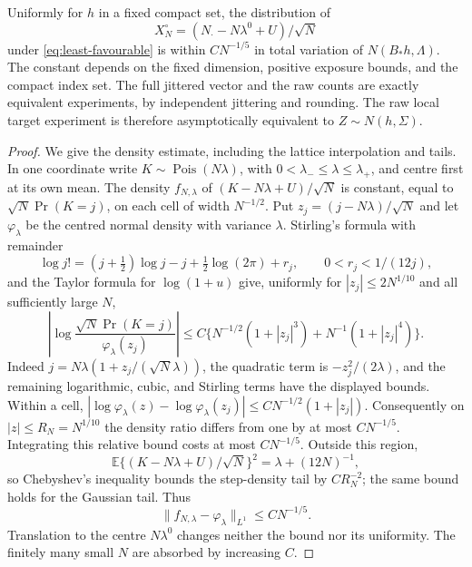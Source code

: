 \begin{lemma}\label{lem:poisson-TV}
Uniformly for $h$ in a fixed compact set, the distribution of
\[
 X_N^\circ=(N_\cdot-N\lambda^0+U)/\sqrt N
\]
under \eqref{eq:least-favourable} is within $C N^{-1/5}$ in total variation of
$N(B_*h,\Lambda)$. The constant depends on the fixed dimension, positive exposure bounds, and the compact index set. The full jittered vector and the raw counts are exactly equivalent experiments, by independent jittering and rounding. The raw local target experiment is therefore asymptotically equivalent to $Z\sim N(h,\Sigma)$.
\end{lemma}
\begin{proof}
We give the density estimate, including the lattice interpolation and tails. In one coordinate write $K\sim\operatorname{Pois}(N\lambda)$, with $0<\lambda_-\le\lambda\le\lambda_+$, and centre first at its own mean. The density $f_{N,\lambda}$ of $(K-N\lambda+U)/\sqrt N$ is constant, equal to $\sqrt N\Pr(K=j)$, on each cell of width $N^{-1/2}$. Put $z_j=(j-N\lambda)/\sqrt N$ and let $\varphi_\lambda$ be the centred normal density with variance $\lambda$. Stirling's formula with remainder
\[
 \log j!=(j+\tfrac12)\log j-j+\tfrac12\log(2\pi)+r_j,
       \qquad 0<r_j<1/(12j),
\]
and the Taylor formula for $\log(1+u)$ give, uniformly for
$|z_j|\le 2N^{1/10}$ and all sufficiently large $N$,
\[
 \left|\log\frac{\sqrt N\Pr(K=j)}{\varphi_\lambda(z_j)}\right|
 \le C\{N^{-1/2}(1+|z_j|^3)+N^{-1}(1+|z_j|^4)\}.
\]
Indeed $j=N\lambda(1+z_j/(\sqrt N\lambda))$, the quadratic term is $-z_j^2/(2\lambda)$, and the remaining logarithmic, cubic, and Stirling terms have the displayed bounds. Within a cell,
$|\log\varphi_\lambda(z)-\log\varphi_\lambda(z_j)|
 \le C N^{-1/2}(1+|z_j|)$.
Consequently on $|z|\le R_N=N^{1/10}$ the density ratio differs from one by at most $C N^{-1/5}$. Integrating this relative bound costs at most $C N^{-1/5}$. Outside this region,
\[
 \mathbb E\{(K-N\lambda+U)/\sqrt N\}^2
           =\lambda+(12N)^{-1},
\]
so Chebyshev's inequality bounds the step-density tail by $C R_N^{-2}$; the same bound holds for the Gaussian tail. Thus
\begin{equation}\label{eq:poisson-quantitative}
 \|f_{N,\lambda}-\varphi_\lambda\|_{L^1}
                       \le C N^{-1/5}.
\end{equation}
Translation to the centre $N\lambda^0$ changes neither the bound nor its uniformity. The finitely many small $N$ are absorbed by increasing $C$.


\end{proof}
